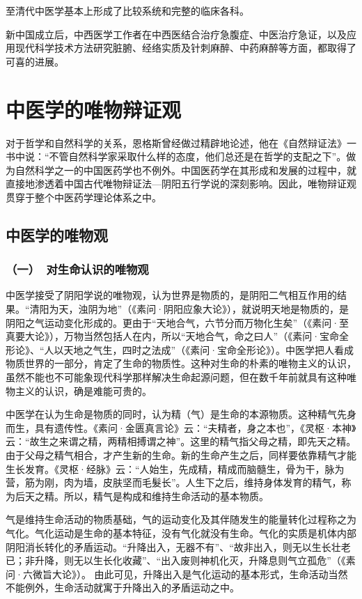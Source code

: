 \documentclass[a4paper,12pt,UTF8,twoside]{ctexbook}
\begin{document}
至清代中医学基本上形成了比较系统和完整的临床各科。

新中国成立后，中西医学工作者在中西医结合治疗急腹症、中医治疗急证，以及应用现代科学技术方法研究脏腑、经络实质及针刺麻醉、中药麻醉等方面，都取得了可喜的进展。

\section{中医学的唯物辩证观}

对于哲学和自然科学的关系，恩格斯曾经做过精辟地论述，他在《自然辩证法》一书中说：“不管自然科学家采取什么样的态度，他们总还是在哲学的支配之下”。做为自然科学之一的中国医药学也不例外。中国医药学在其形成和发展的过程中，就直接地渗透着中国古代唯物辩证法—阴阳五行学说的深刻影响。因此，唯物辩证观贯穿于整个中医药学理论体系之中。

\subsection{中医学的唯物观}

\subsubsection{（一）\ 对生命认识的唯物观}

中医学接受了阴阳学说的唯物观，认为世界是物质的，是阴阳二气相互作用的结果。“清阳为天，浊阴为地”（《素问·阴阳应象大论》），就说明天地是物质的，是阴阳之气运动变化形成的。更由于“天地合气，六节分而万物化生矣”（《素问·至真要大论》），万物当然包括人在内，所以“天地合气，命之曰人”（《素问·宝命全形论》、“人以天地之气生，四时之法成”（《素问·宝命全形论》）。中医学把人看成物质世界的一部分，肯定了生命的物质性。这种对生命的朴素的唯物主义的认识，虽然不能也不可能象现代科学那样解决生命起源问题，但在数千年前就具有这种唯物主义的认识，确是难能可贵的。

中医学在认为生命是物质的同时，认为精（气）是生命的本源物质。这种精气先身而生，具有遗传性。《素问·金匮真言论》云：“夫精者，身之本也”，《灵枢·本神》云：“故生之来谓之精，两精相搏谓之神”。这里的精气指父母之精，即先天之精。由于父母之精气相合，才产生新的生命。新的生命产生之后，同样要依靠精气才能生长发育。《灵枢·经脉》云：“人始生，先成精，精成而脑髓生，骨为干，脉为营，筋为刚，肉为墙，皮肤坚而毛髮长”。人生下之后，维持身体发育的精气，称为后天之精。所以，精气是构成和维持生命活动的基本物质。

气是维持生命活动的物质基础，气的运动变化及其伴随发生的能量转化过程称之为气化。气化运动是生命的基本特征，没有气化就没有生命。气化的实质是机体内部阴阳消长转化的矛盾运动。“升降出入，无器不有”、“故非出入，则无以生长壮老已；非升降，则无以生长化收藏”、“出入废则神机化灭，升降息则气立孤危”（《素问·六微旨大论》）。 由此可见，升降出入是气化运动的基本形式，生命活动当然不能例外，生命活动就寓于升降出入的矛盾运动之中。
\end{document}
